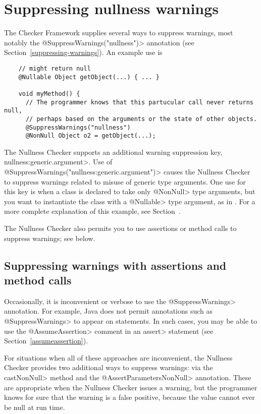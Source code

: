 \section{Suppressing nullness warnings\label{suppressing-warnings-nullness}}

The Checker Framework supplies several ways to suppress warnings, most
notably the \<@SuppressWarnings("nullness")> annotation (see
Section~\ref{suppressing-warnings}).  An example use is

\begin{Verbatim}
    // might return null
    @Nullable Object getObject(...) { ... }

    void myMethod() {
      // The programmer knows that this partucular call never returns null,
      // perhaps based on the arguments or the state of other objects.
      @SuppressWarnings("nullness")
      @NonNull Object o2 = getObject(...);
\end{Verbatim}


The Nullness Checker supports an additional warning suppression key,
\<nullness:generic.argument>.
Use of \<@SuppressWarnings("nullness:generic.argument")> causes the Nullness
Checker to suppress warnings related to misuse of generic type
arguments.  One use for this key is when a class is declared to take only
\<@NonNull> type arguments, but you want to instantiate the class with a
\<@Nullable> type argument, as in .  For a more
complete explanation of this example, see
Section~.

The Nullness Checker also permits you to use assertions or method calls to
suppress warnings; see below.



\subsection{Suppressing warnings with assertions and method calls\label{suppressing-warnings-with-assertions}}

Occasionally, it is inconvenient or
verbose to use the \<@SuppressWarnings> annotation.  For example, Java does
not permit annotations such as \<@SuppressWarnings> to appear on statements.
In such cases, you may be able to use the \<@AssumeAssertion> comment in
an \<assert> statement (see Section~\ref{assumeassertion}).

For situations when all of these approaches are inconvenient,
the Nullness Checker provides two additional ways to suppress warnings:
via the \<castNonNull> method and the
\<@AssertParametersNonNull> annotation.  These are
appropriate when the Nullness Checker issues a warning, but the programmer
knows for sure that the warning is a false positive, because the value
cannot ever be null at run time.


